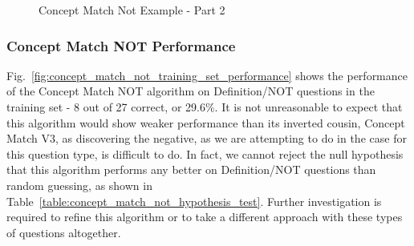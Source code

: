 \begin{figure}
\centering
\vspace{0.75in}
\caption{Concept Match Not Example - Part 2}
\label{fig:concept_match_not_example_part_2}
\end{figure}

\subsubsection{Concept Match NOT Performance}

Fig.~\ref{fig:concept_match_not_training_set_performance} shows the performance of the Concept Match NOT algorithm on Definition/NOT questions in the training set - 8 out of 27 correct, or 29.6\%.  It is not unreasonable to expect that this algorithm would show weaker performance than its inverted cousin, Concept Match V3, as discovering the negative, as we are attempting to do in the case for this question type, is difficult to do.  In fact, we cannot reject the null hypothesis that this algorithm performs any better on Definition/NOT questions than random guessing, as shown in Table~\ref{table:concept_match_not_hypothesis_test}.  Further investigation is required to refine this algorithm or to take a different approach with these types of questions altogether.



